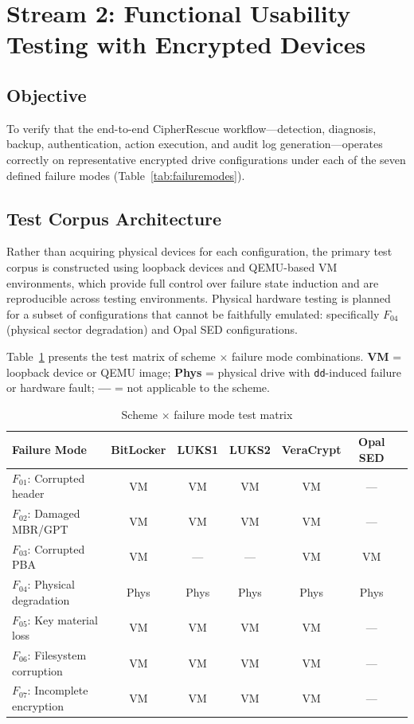 \documentclass[11pt,a4paper]{report}
\begin{document}
\section{Stream 2: Functional Usability Testing with Encrypted Devices}
\label{sec:empirical:stream2}

\subsection{Objective}

To verify that the end-to-end CipherRescue workflow---detection, diagnosis, backup,
authentication, action execution, and audit log generation---operates correctly on
representative encrypted drive configurations under each of the seven defined failure
modes (Table~\ref{tab:failuremodes}).

\subsection{Test Corpus Architecture}

Rather than acquiring physical devices for each configuration, the primary test corpus is
constructed using loopback devices and QEMU-based VM environments, which provide full
control over failure state induction and are reproducible across testing environments.
Physical hardware testing is planned for a subset of configurations that cannot be
faithfully emulated: specifically $F_{04}$ (physical sector degradation) and Opal SED
configurations.

Table~\ref{tab:testmatrix} presents the test matrix of scheme $\times$ failure mode
combinations. \textbf{VM} = loopback device or QEMU image; \textbf{Phys} = physical drive
with \texttt{dd}-induced failure or hardware fault; \textbf{---} = not applicable to the
scheme.

\begin{table}[htbp]
\centering
\caption{Scheme $\times$ failure mode test matrix}
\label{tab:testmatrix}
\begin{tabular}{@{}lcccccc@{}}
\toprule
\textbf{Failure Mode} & \textbf{BitLocker} & \textbf{LUKS1} & \textbf{LUKS2} & \textbf{VeraCrypt} & \textbf{Opal SED} \\
\midrule
$F_{01}$: Corrupted header       & VM   & VM   & VM   & VM   & ---  \\
$F_{02}$: Damaged MBR/GPT        & VM   & VM   & VM   & VM   & ---  \\
$F_{03}$: Corrupted PBA          & VM   & ---  & ---  & VM   & VM   \\
$F_{04}$: Physical degradation   & Phys & Phys & Phys & Phys & Phys \\
$F_{05}$: Key material loss      & VM   & VM   & VM   & VM   & ---  \\
$F_{06}$: Filesystem corruption  & VM   & VM   & VM   & VM   & ---  \\
$F_{07}$: Incomplete encryption  & VM   & VM   & VM   & VM   & ---  \\
\bottomrule
\end{tabular}
\end{table}
\end{document}
